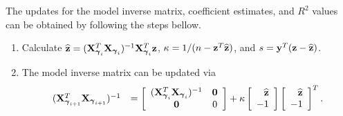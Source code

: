 The updates for the model inverse matrix, coefficient estimates, and $R^2$
values can be obtained by following the steps bellow.
\begin{enumerate}
	\item Calculate $\widehat{{\bf z}} = ({\bf X}_{{\boldsymbol \gamma}_i}^T{\bf X}_{{\boldsymbol \gamma}_i})^{-1}{\bf X}_{{\boldsymbol \gamma}_i}^T{\bf z}$, 
	$\kappa 
	= 1/(n - {\bf z}^T\widehat{{\bf z}})$, and  $s = {\bf y}^T({\bf z} - \widehat{{\bf z}})$.
	
	\item The model inverse matrix can be updated via  
	$$
	\begin{array}{rl}
	({\bf X}_{{\boldsymbol \gamma}_{i+1}}^T{\bf X}_{{\boldsymbol \gamma}_{i+1}})^{-1}
	&\displaystyle = 
	\left[ \begin{array}{cc}
	({\bf X}_{{\boldsymbol \gamma}_{i}}^T{\bf X}_{{\boldsymbol \gamma}_{i}})^{-1}    & {\bf 0} \\
	{\bf 0}             
	& 0
	\end{array} \right] + \kappa \left[ \begin{array}{r}
	\widehat{{\bf z}} \\
	-1 \\
	\end{array} \right] \left[ \begin{array}{r}
	\widehat{{\bf z}} \\
	-1 \\
	\end{array} \right]^T.
	\end{array} 
	$$
	

\end{enumerate}
